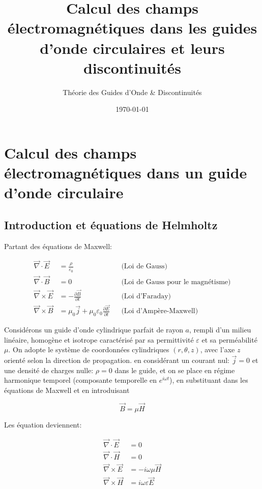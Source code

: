 \documentclass[12pt,a4paper]{report}
\title{\textbf{Calcul des champs électromagnétiques dans les guides d'onde circulaires et leurs discontinuités}}
\author{Théorie des Guides d'Onde \& Discontinuités}
\date{\today}
\begin{document}
\maketitle

\tableofcontents
\newpage

\chapter{Calcul des champs électromagnétiques dans un guide d'onde circulaire}

\section{Introduction et équations de Helmholtz}

Partant des équations de Maxwell:

\begin{align}
\vec{\nabla} \cdot \vec{E} &= \frac{\rho}{\varepsilon_0} && \text{(Loi de Gauss)} \\
\vec{\nabla} \cdot \vec{B} &= 0 && \text{(Loi de Gauss pour le magnétisme)} \\
\vec{\nabla} \times \vec{E} &= -\frac{\partial \vec{B}}{\partial t} && \text{(Loi d'Faraday)} \\
\vec{\nabla} \times \vec{B} &= \mu_0 \vec{j} + \mu_0 \varepsilon_0 \frac{\partial \vec{E}}{\partial t} && \text{(Loi d'Ampère-Maxwell)}
\end{align}

Considérons un guide d'onde cylindrique parfait de rayon $a$, rempli d'un milieu linéaire, homogène et isotrope caractérisé par sa permittivité $\varepsilon$ et sa perméabilité $\mu$. On adopte le système de coordonnées cylindriques $(r, \theta, z)$, avec l'axe $z$ orienté selon la direction de propagation.
en considérant un courant nul: $\vec{j}=0$ et une densité de charges nulle: $\rho=0$ dans le guide, et on se place en régime harmonique temporel (composante temporelle en $e^{i\omega t}$), en substituant dans les équations de Maxwell et en introduisant

\begin{equation}
\vec{B} = \mu \vec{H}
\end{equation}

Les équation deviennent:

\begin{align}
\vec{\nabla} \cdot \vec{E} &= 0 \\
\vec{\nabla} \cdot \vec{H} &= 0 \\
\vec{\nabla} \times \vec{E} &= -i \omega \mu \vec{H} \\
\vec{\nabla} \times \vec{H} &= i \omega \varepsilon \vec{E}
\end{align}
\end{document}
